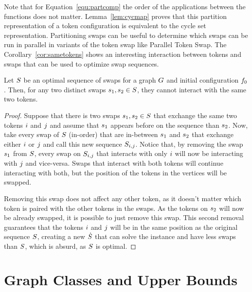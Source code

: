 \documentclass[msc,english,table,xcdraw]{ppgccufmg}
\begin{document}
Note that for Equation~\ref{equ:partcomp} the order of the applications
between the functions does not matter.
Lemma~\ref{lem:cycmap} proves that this partition representation of a 
token configuration is equivalent to the cycle set representation.
Partitioning swaps can be useful to determine which swaps can be run
in parallel in variants of the token swap like Parallel Token Swap.
The Corollary~\ref{cor:sametokens} shows an interesting interaction
between tokens and swaps that can be used to optimize swap sequences.

\begin{corollary}
\label{cor:sametokens}
Let $S$ be an optimal sequence of swaps for a graph $G$ and
initial configuration $f_{0}$.
Then, for any two distinct swaps $s_{1},s_{2} \in S$,
they cannot interact with the same two tokens.
\end{corollary}

\begin{proof}
Suppose that there is two swaps $s_{1},s_{2} \in S$ that 
exchange the same two tokens $i$ and $j$ and assume that $s_{1}$
appears before on the sequence than $s_{2}$.
Now, take every swap of $S$ (in-order) that are in-between $s_{1}$ 
and $s_{2}$ that exchange either $i$ or $j$ and call this
new sequence $S_{i,j}$.
Notice that, by removing the swap $s_{1}$ from $S$, every swap
on $S_{i,j}$ that interacts with only $i$ will now
be interacting with $j$ and vice-versa.
Swaps that interact with both tokens will continue interacting with both, 
but the position of the tokens in the vertices will be swapped.

Removing this swap does not affect any other token, as it doesn't matter
which token is paired with the other tokens in the swaps.
As the tokens on $s_{2}$ will now be already swapped, it is possible
to just remove this swap.
This second removal guarantees that the tokens $i$ and $j$ will
be in the same position as the original sequence $S$, creating a new
$\dot{S}$ that can solve the instance and have less swaps than
$S$, which is absurd, as $S$ is optimal.
\end{proof}

\section{Graph Classes and Upper Bounds}
\label{sec:intro:classes_uppers}
\end{document}
